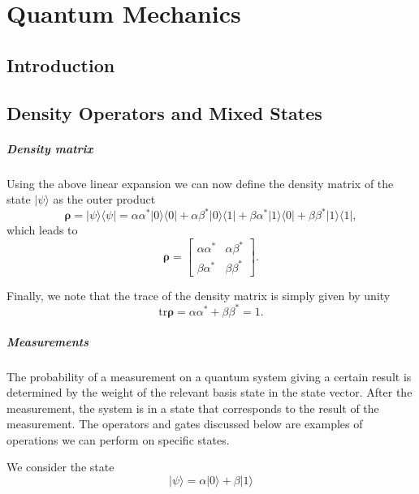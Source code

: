 \chapter{Quantum Mechanics}
\section{Introduction}
\section{Density Operators and Mixed States}


\paragraph{Density matrix}

Using the above linear expansion we can now define the density matrix of the state $\vert \psi\rangle$ as the outer product
\[
\bm{\rho}=\vert \psi \rangle\langle \psi \vert = \alpha\alpha^* \vert 0 \rangle\langle 0\vert+\alpha\beta^* \vert 0 \rangle\langle 1\vert+\beta\alpha^* \vert 1 \rangle\langle 0\vert+\beta\beta^* \vert 1 \rangle\langle 1\vert,
\]
which leads to
\[
\bm{\rho}=\begin{bmatrix} \alpha\alpha^* & \alpha\beta^*\\ \beta\alpha^* & \beta\beta^*\end{bmatrix}.
\]

Finally, we note that the trace of the density matrix is simply given by unity
\[
\mathrm{tr}\bm{\rho}=\alpha\alpha^* +\beta\beta^*=1.
\]



\paragraph{Measurements}

The probability of a measurement on a quantum system giving a certain
result is determined by the weight of the relevant basis state in the
state vector. After the measurement, the system is in a state that
corresponds to the result of the measurement. The operators and
gates discussed below are examples of operations we can perform on
specific states.

We  consider the state
\[
\vert \psi\rangle = \alpha \vert 0 \rangle +\beta \vert 1 \rangle
\]


